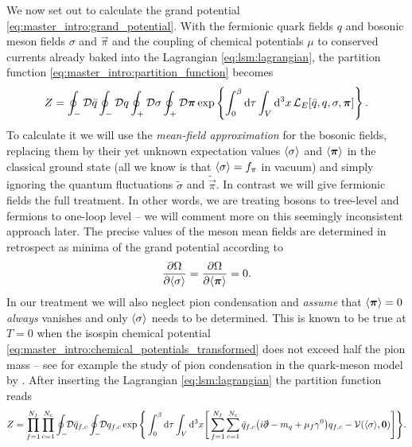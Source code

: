 We now set out to calculate the grand potential \eqref{eq:master_intro:grand_potential}.
With the fermionic quark fields $q$ and bosonic meson fields $\sigma$ and $\vec\pi$
and the coupling of chemical potentials $\mu$ to conserved currents already baked into the Lagrangian \eqref{eq:lsm:lagrangian},
the partition function \eqref{eq:master_intro:partition_function} becomes
\begin{equation}
	Z = \oint_- \mathcal{D} \bar{q} \oint_- \mathcal{D} q \oint_+ \mathcal{D} \sigma \oint_+ \mathcal{D} {\bm{\pi}} \exp \left\{ \int_0^\beta \mathop{}\!\mathrm{d} \tau \int_V \mathop{}\!\mathrm{d}^3 x \, \mathcal{L}_E[\bar{q}, q, \sigma, {\bm{\pi}}]  \right\} .
\end{equation}
To calculate it we will use the \emph{mean-field approximation} for the bosonic fields,
replacing them by their yet unknown expectation values $\langle \sigma \rangle$ and $\langle {\bm{\pi}} \rangle$ in the classical ground state
(all we know is that $\langle \sigma \rangle=f_\pi$ in vacuum)
and simply ignoring the quantum fluctuations $\tilde{\sigma}$ and $\tilde{\vec\pi}$.
In contrast we will give fermionic fields the full treatment.
In other words, we are treating bosons to tree-level and fermions to one-loop level
-- we will comment more on this seemingly inconsistent approach later.
The precise values of the meson mean fields are determined in retrospect as minima of the grand potential according to
\begin{equation}
	\pdv{\Omega}{ \langle \sigma \rangle} = \pdv{\Omega}{ \langle {\bm{\pi}} \rangle} = 0.
\label{eq:lsm:gap_equation}
\end{equation}
In our treatment we will also neglect pion condensation and \emph{assume} that $\langle {\bm{\pi}} \rangle=0$ \emph{always} vanishes
and only $\langle \sigma \rangle$ needs to be determined.
This is known to be true at $T=0$ when the isospin chemical potential \eqref{eq:master_intro:chemical_potentials_transformed} does not exceed half the pion mass
-- see for example the study of pion condensation in the quark-meson model by \cite{ref:jo_lsm_consistent,ref:jo_lsm_pion_condensation}.
After inserting the Lagrangian \eqref{eq:lsm:lagrangian} the partition function reads
\begin{equation}
	Z = \prod_{f=1}^{\smash{N_f}} \prod_{c=1}^{\smash{N_c}} \oint_- \!\! \mathcal{D} \bar{q}_{f,c} \oint_- \!\! \mathcal{D} q_{f,c} \exp \Bigg\{ \int_0^{\beta} \mathop{}\!\mathrm{d} \tau \int_V \mathop{}\!\mathrm{d}^3 x \Bigg[ \sum_{f=1}^{\smash{N_f}} \sum_{c=1}^{N_c} \bar{q}_{f,c} \big( i \slashed\partial - m_q + \mu_f \gamma^0 \big) q_{f,c} - \mathcal{V}(\langle \sigma \rangle,{\bm{0}}) \Bigg] \Bigg\}.
\end{equation}
